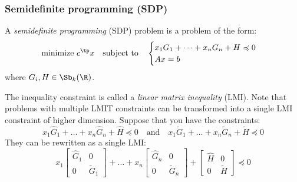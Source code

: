 \subsubsection{Semidefinite programming (SDP)}
\begin{definition}
    A \emph{semidefinite programming} (SDP) problem is a problem of the form:
    \begin{equation*}
        \text{minimize } c^\tp x \quad\text{subject to}\quad \begin{cases}
            x_1G_1+\dots+x_nG_n+H\preccurlyeq 0\\
            Ax=b
        \end{cases}
    \end{equation*}
    where $G_i, H\in\Sb_k(\R)$. 
    
    \begin{remark}
        The inequality constraint is called a \emph{linear matrix inequality} (LMI). Note that problems with multiple LMIT constraints can be transformed into a single LMI constraint of higher dimension. Suppose that you have the constraints:
        \begin{equation*}
            x_1\hat{G}_1+\dots+x_n\hat{G}_n+\hat{H}\preccurlyeq0 \quad\text{and}\quad x_1\tilde{G}_1+\dots+x_n\tilde{G}_n+\tilde{H}\preccurlyeq0
        \end{equation*}
        They can be rewritten as a single LMI:
        \begin{equation*}
            x_1\begin{bmatrix}
                \hat{G}_1 & 0\\
                0 & \tilde{G}_1
            \end{bmatrix}
            +\dots+
            x_n\begin{bmatrix}
                \hat{G}_n & 0\\
                0 & \tilde{G}_n
            \end{bmatrix}
            +\begin{bmatrix}
                \hat{H} & 0\\
                0 & \tilde{H}
            \end{bmatrix}\preccurlyeq0
        \end{equation*}
    \end{remark}
\end{definition}

